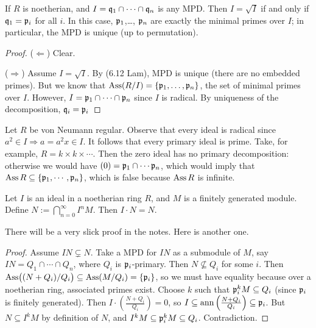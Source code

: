  \begin{theorem}
   If $R$ is noetherian, and $I=\mathfrak{q}_1\cap \cdots\cap \mathfrak{q}_n$ is any MPD. Then $I=\sqrt I$ if
   and only if $\mathfrak{q}_1=\mathfrak{p}_i$ for all $i$. In this case, $\mathfrak{p}_1$,\dots, $\mathfrak{p}_n$ are exactly
   the minimal primes over $I$; in particular, the MPD is unique (up to permutation).
 \end{theorem}
 \begin{proof}
   ($\Leftarrow$) Clear.

   ($\Rightarrow$) Assume $I=\sqrt I$. By (6.12 Lam), MPD is unique (there are no
   embedded primes). But we know that $\operatorname{Ass}(R/I)=\{\mathfrak{p}_1,\dots, \mathfrak{p}_n\}$, the set of
   minimal primes over $I$. However, $I=\mathfrak{p}_1\cap\cdots \cap \mathfrak{p}_n$ since $I$ is radical.
   By uniqueness of the decomposition, $\mathfrak{q}_i=\mathfrak{p}_i$
 \end{proof}
 \begin{remark}
   Let $R$ be von Neumann regular. Observe that every ideal is radical since $a^2\in
   I\Rightarrow a=a^2x\in I$. It follows that every primary ideal is prime. Take, for
   example, $R=k\times k\times \cdots$. Then the zero ideal has no primary decomposition:
   otherwise we would have $(0)=\mathfrak{p}_1\cap \cdots \mathfrak{p}_n$, which would imply that $\operatorname{Ass}
   R\subseteq \{\mathfrak{p}_1,\cdots, \mathfrak{p}_n\}$, which is false because $\operatorname{Ass} R$ is infinite.
 \end{remark}


 \begin{theorem}
   Let $I$ is an ideal in a noetherian ring $R$, and $M$ is a finitely generated module.
   Define $N:= \bigcap_{n=0}^\infty I^n M$. Then $I\cdot N=N$.
 \end{theorem}
 There will be a very slick proof in the notes. Here is another one.
 \begin{proof}
   Assume $IN\subsetneq N$. Take a MPD for $IN$ as a submodule of $M$, say $IN=Q_1\cap
   \cdots \cap Q_n$, where $Q_i$ is $\mathfrak{p}_i$-primary. Then $N\not\subseteq Q_i$ for some
   $i$. Then $\operatorname{Ass}\bigl( (N+Q_i)/Q_i\bigr)\subseteq \operatorname{Ass}(M/Q_i)=\{\mathfrak{p}_i\}$, so we must
   have equality because over a noetherian ring, associated primes exist. Choose $k$ such
   that $\mathfrak{p}_i^k M\subseteq Q_i$ (since $\mathfrak{p}_i$ is finitely generated). Then $I\cdot
   \left(\frac{N+Q_i}{Q_i}\right)=0$, so $I\subseteq \operatorname{ann}
   \left(\frac{N+Q_i}{Q_i}\right)\subseteq \mathfrak{p}_i$. But $N\subseteq I^k M$ by definition of
   $N$, and $I^k M\subseteq \mathfrak{p}_i^k M \subseteq Q_i$. Contradiction.
 \end{proof}
